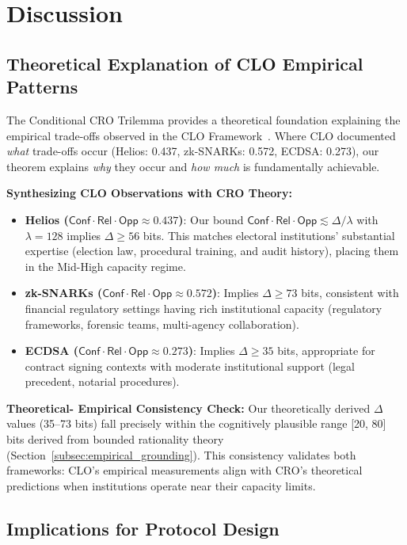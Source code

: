 \documentclass{ieeeaccess}
\newcommand{\Conf}{\mathsf{Conf}}
\newcommand{\Rel}{\mathsf{Rel}}
\newcommand{\Opp}{\mathsf{Opp}}
\begin{document}
\section{Discussion}\label{sec:discussion}

\subsection{Theoretical Explanation of CLO Empirical Patterns}

The Conditional CRO Trilemma provides a theoretical foundation explaining the empirical trade-offs observed in the CLO Framework~\cite{Minka2026CLO}. Where CLO documented \emph{what} trade-offs occur (Helios: 0.437, zk-SNARKs: 0.572, ECDSA: 0.273), our theorem explains \emph{why} they occur and \emph{how much} is fundamentally achievable.

\textbf{Synthesizing CLO Observations with CRO Theory:}
\begin{itemize}
\item \textbf{Helios ($\Conf \cdot \Rel \cdot \Opp \approx 0.437$)}: Our bound $\Conf \cdot \Rel \cdot \Opp \lesssim \Delta/\lambda$ with $\lambda = 128$ implies $\Delta \geq 56$ bits. This matches electoral institutions' substantial expertise (election law, procedural training, and audit history), placing them in the Mid-High capacity regime.

\item \textbf{zk-SNARKs ($\Conf \cdot \Rel \cdot \Opp \approx 0.572$)}: Implies $\Delta \geq 73$ bits, consistent with financial regulatory settings having rich institutional capacity (regulatory frameworks, forensic teams, multi-agency collaboration).

\item \textbf{ECDSA ($\Conf \cdot \Rel \cdot \Opp \approx 0.273$)}: Implies $\Delta \geq 35$ bits, appropriate for contract signing contexts with moderate institutional support (legal precedent, notarial procedures).
\end{itemize}

\textbf{Theoretical- Empirical Consistency Check:}
Our theoretically derived $\Delta$ values (35--73 bits) fall precisely within the cognitively plausible range [20, 80] bits derived from bounded rationality theory (Section~\ref{subsec:empirical_grounding}). This consistency validates both frameworks: CLO's empirical measurements align with CRO's theoretical predictions when institutions operate near their capacity limits.

\subsection{Implications for Protocol Design}
\end{document}

